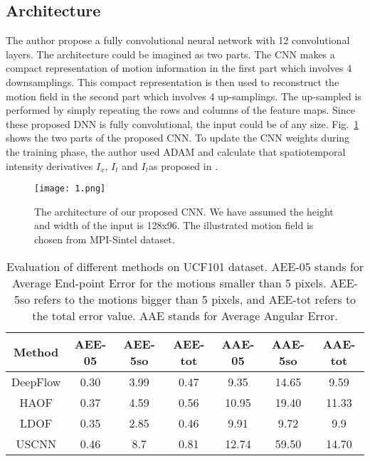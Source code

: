 \documentclass[10pt,twocolumn,letterpaper]{article}
\begin{document}
\subsection{Architecture}
The author propose a fully convolutional neural network with 12 convolutional layers. The architecture could be imagined as two parts. The CNN makes a compact representation of motion information in the first part which involves 4 downsamplings. This compact representation is then used to reconstruct the motion field in the second part which involves 4 up-samplings. The up-sampled is performed by simply repeating the rows and columns of the feature maps. Since these proposed DNN is fully convolutional, the input could be of any size. Fig.~\ref{1} shows the two parts of the proposed CNN. To update the CNN weights during the training phase, the author used ADAM and calculate that spatiotemporal intensity
derivatives $I_x$, $I_t$ and $I_t$as proposed in \cite{Butler2012A}.

\begin{figure*}
\begin{center}
  \texttt{[image: 1.png]}\\
  \caption{The architecture of our proposed CNN. We have assumed the height and width of the input is 128x96. The illustrated motion field is chosen from MPI-Sintel dataset.}\label{1}
\end{center}
\end{figure*}

\begin{table*}[htbp]
\centering
\caption{Evaluation of different methods on UCF101 dataset. AEE-05 stands for Average End-point Error for the motions
smaller than 5 pixels. AEE-5so refers to the motions bigger than 5 pixels, and AEE-tot refers to the total error value. AAE
stands for Average Angular Error.}
\begin{tabular}{|c|c|c|c|c|c|c|}
\hline
Method & AEE-05 & AEE-5so & AEE-tot & AAE-05 & AAE-5so & AAE-tot \\
\hline
\hline
DeepFlow & 0.30 & 3.99 & 0.47 & 9.35 & 14.65 & 9.59 \\
\hline
HAOF & 0.37 & 4.59 & 0.56 & 10.95 & 19.40 & 11.33 \\
\hline
LDOF & 0.35 & 2.85 & 0.46 & 9.91 & 9.72 & 9.9 \\
\hline
USCNN & 0.46 & 8.7 & 0.81 & 12.74 & 59.50 & 14.70 \\
\hline
\end{tabular} \\
\label{tab1}
\end{table*}
\end{document}

